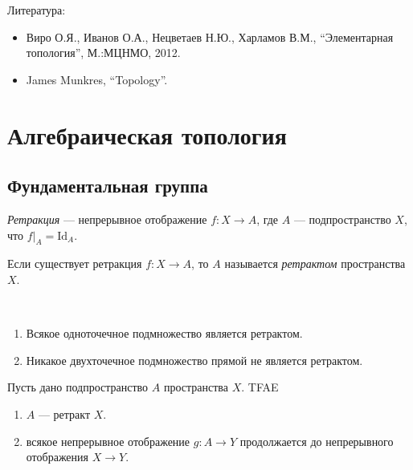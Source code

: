 \documentclass[12pt,a4paper]{article}
\date{}
\newcommand{\Id}{\ensuremath{\mathrm{Id}}\xspace}
\begin{document}
    \maketitle

    \listoftodos[TODOs]

    \tableofcontents

    \vspace{2em}

    Литература:
    \begin{itemize}
        \item Виро О.Я., Иванов О.А., Нецветаев Н.Ю., Харламов В.М., ``Элементарная топология'', М.:МЦНМО, 2012.
        \item James Munkres, ``Topology''.
    \end{itemize}

    \section{Алгебраическая топология}

    \subsection{Фундаментальная группа}

    \begin{definition}
        \emph{Ретракция} --- непрерывное отображение $f: X \to A$, где $A$ --- подпространство $X$, что $f|_A = \Id_A$.

        Если существует ретракция $f: X \to A$, то $A$ называется \emph{ретрактом} пространства $X$.
    \end{definition}

    \begin{example}\ 
        \begin{enumerate}
            \item Всякое одноточечное подмножество является ретрактом.
            \item Никакое двухточечное подмножество прямой не является ретрактом.
        \end{enumerate}
    \end{example}

    \begin{theorem}
        Пусть дано подпространство $A$ пространства $X$. TFAE
        \begin{enumerate}
            \item $A$ --- ретракт $X$.
            \item всякое непрерывное отображение $g: A \to Y$ продолжается до непрерывного отображения $X \to Y$.
        \end{enumerate}
    \end{theorem}
\end{document}
